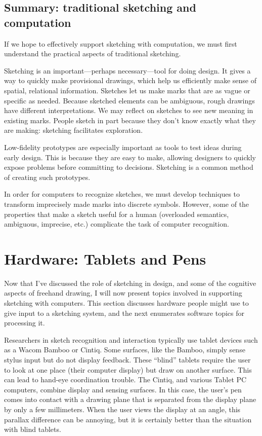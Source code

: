 \subsection{Summary: traditional sketching and computation}
\label{ref:traditional-summary}

If we hope to effectively support sketching with computation, we must
first understand the practical aspects of traditional sketching. 

Sketching is an important---perhaps necessary---tool for doing
design. It gives a way to quickly make provisional drawings, which
help us efficiently make sense of spatial, relational
information. Sketches let us make marks that are as vague or specific
as needed. Because sketched elements can be ambiguous, rough drawings
have different interpretations. We may reflect on sketches to see new
meaning in existing marks. People sketch in part because they don't
know exactly what they are making: sketching facilitates exploration.

Low-fidelity prototypes are especially important as tools to test
ideas during early design. This is because they are easy to make,
allowing designers to quickly expose problems before committing to
decisions. Sketching is a common method of creating such prototypes.

In order for computers to recognize sketches, we must develop
techniques to transform imprecisely made marks into discrete
symbols. However, some of the properties that make a sketch useful for
a human (overloaded semantics, ambiguous, imprecise, etc.) complicate
the task of computer recognition.


\section{Hardware: Tablets and Pens}

Now that I've discussed the role of sketching in design, and some of
the cognitive aspects of freehand drawing, I will now present topics
involved in supporting sketching with computers. This section
discusses hardware people might use to give input to a sketching
system, and the next enumerates software topics for processing it.

Researchers in sketch recognition and interaction typically use tablet
devices such as a Wacom Bamboo or Cintiq. Some surfaces, like the
Bamboo, simply sense stylus input but do not display feedback. These
``blind'' tablets require the user to look at one place (their
computer display) but draw on another surface. This can lead to
hand-eye coordination trouble. The Cintiq, and various Tablet PC
computers, combine display and sensing surfaces. In this case, the
user's pen comes into contact with a drawing plane that is separated
from the display plane by only a few millimeters. When the user views
the display at an angle, this parallax difference can be annoying, but
it is certainly better than the situation with blind tablets.

